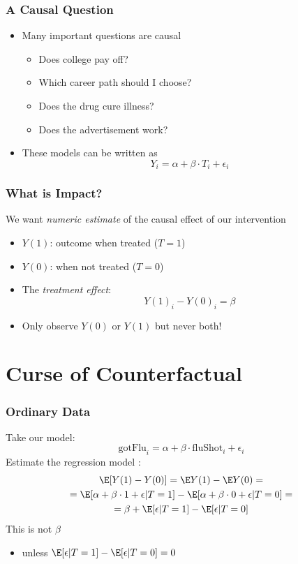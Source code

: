 \documentclass[mathserif, xcolor=table, svgnames]{beamer}
\begin{document}
\begin{frame}
  \frametitle{A Causal Question}
  \begin{itemize}
  \item Many important questions are causal
    \begin{itemize}
    \item Does college pay off?
    \item Which career path should I choose?
    \item Does the drug cure illness?
    \item Does the advertisement work?
    \end{itemize}
  \item These models can be written as
    \begin{equation*}
      Y_{i} = \alpha + \beta \cdot T_{i} + \epsilon_{i}
    \end{equation*}
  \end{itemize}
\end{frame}

\begin{frame}
  \frametitle{What is Impact?}
  We want \emph{numeric estimate} of the causal
  effect of our intervention
  \begin{itemize}
  \item $Y(1)$: outcome when treated ($T=1$)
  \item $Y(0)$: when not treated ($T=0$)
  \item The \emph{treatment effect}:
    \begin{equation*}
      Y(1)_{i} - Y(0)_{i} = \beta
    \end{equation*}
  \item \alert{Only observe} $Y(0)$ or $Y(1)$ but never both! 
  \end{itemize}
\end{frame}

\section[Counterfactual]{Curse of Counterfactual}
\frame{\tableofcontents[currentsection]}

\begin{frame}
  \frametitle{Ordinary Data}
  Take our model:
  \begin{equation*}
    \text{gotFlu}_{i} = \alpha + \beta \cdot \text{fluShot}_{i} + \epsilon_{i}
  \end{equation*}
  Estimate the regression model \hyperlink{proof}{}:
  \begin{multline*}
    \E [Y(1) - Y(0)] =
    \E Y(1) - \E Y(0) =
    \\
    = \E [ \alpha + \beta \cdot 1 + \epsilon | T=1]
    - \E [ \alpha + \beta \cdot 0 + \epsilon | T=0] =
    \\
    =
    \beta + \E [\epsilon|T = 1] - \E [\epsilon |T =0]
  \end{multline*}
  This is not $\beta$
  \begin{itemize}
  \item unless $\E [\epsilon|T = 1] - \E [\epsilon |T = 0] = 0$
  \end{itemize}
\end{frame}
\end{document}
